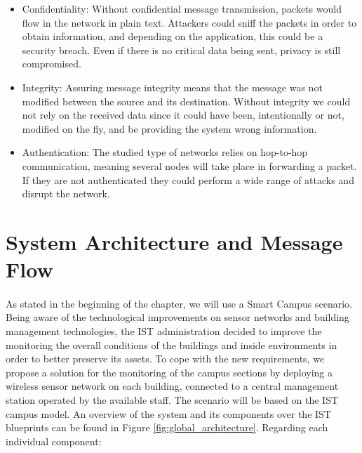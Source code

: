 \begin{itemize}
	\item Confidentiality: Without confidential message transmission, packets would flow in the network in plain text. Attackers could sniff the packets in order to obtain information, and depending on the application, this could be a security breach. Even if there is no critical data being sent, privacy is still compromised.\\
	\item Integrity: Assuring message integrity means that the message was not modified between the source and its destination. Without integrity we could not rely on the received data since it could have been, intentionally or not, modified on the fly, and be providing the system wrong information.\\
	\item Authentication: The studied type of networks relies on hop-to-hop communication, meaning several nodes will take place in forwarding a packet. If they are not authenticated they could perform a wide range of attacks and disrupt the network.
\end{itemize}

\section{System Architecture and Message Flow}
\paragraph{}

As stated in the beginning of the chapter, we will use a Smart Campus scenario. Being aware of the technological improvements on sensor networks and building management technologies, the \gls{IST} administration decided to improve the monitoring the overall conditions of the buildings and inside environments in order to better preserve its assets. To cope with the new requirements, we propose a solution for the monitoring of the campus sections by deploying a wireless sensor network on each building, connected to a central management station operated by the available staff. The scenario will be based on the \gls{IST} campus model. An overview of the system and its components over the \gls{IST} blueprints can be found in Figure \ref{fig:global_architecture}. Regarding each individual component:

